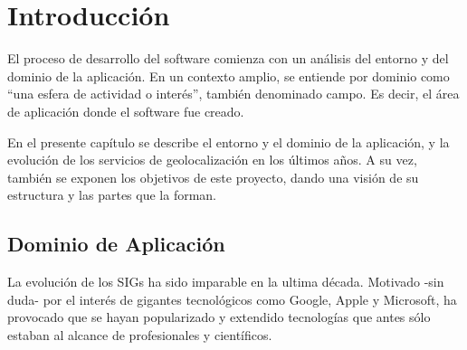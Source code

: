 \chapter[Introducción]{
  \label{chp:introduccion}
  Introducción
}
\minitoc
\newpage

El proceso de desarrollo del software comienza con un análisis del entorno y
del dominio de la aplicación. En un contexto amplio, se entiende por dominio
como ``una esfera de actividad o interés'', también denominado campo. Es decir,
el área de aplicación donde el software fue creado.

En el presente capítulo se describe el entorno y el dominio de la aplicación, y la
evolución de los servicios de geolocalización en los últimos años. A su vez,
también se exponen los objetivos de este proyecto, dando una visión
de su estructura y las partes que la forman.


\section{Dominio de Aplicación}

La evolución de los \glspl{SIG} ha sido imparable en la ultima década. Motivado 
-sin duda- por el interés de gigantes tecnológicos como Google, Apple y Microsoft, 
ha provocado que se hayan popularizado y extendido tecnologías que  antes sólo 
estaban al alcance de profesionales y científicos.

